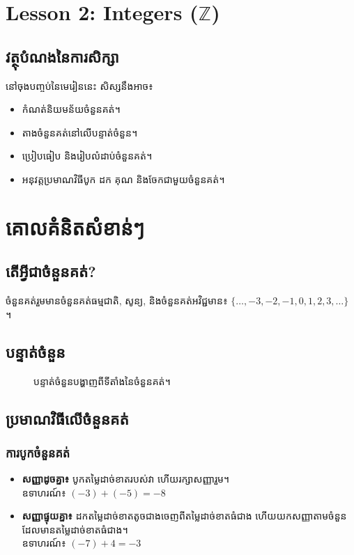 \clearpage
\setcounter{section}{0}

\section*{Lesson 2: Integers ($\mathbb{Z}$)}


\subsection*{វត្ថុបំណងនៃការសិក្សា}
នៅចុងបញ្ចប់នៃមេរៀននេះ សិស្សនឹងអាច៖
\begin{itemize}[label=---]
    \item កំណត់និយមន័យចំនួនគត់។
    \item តាងចំនួនគត់នៅលើបន្ទាត់ចំនួន។
    \item ប្រៀបធៀប និងរៀបលំដាប់ចំនួនគត់។
    \item អនុវត្តប្រមាណវិធីបូក ដក គុណ និងចែកជាមួយចំនួនគត់។
\end{itemize}

\section{គោលគំនិតសំខាន់ៗ}
\subsection{តើអ្វីជាចំនួនគត់?}
ចំនួនគត់រួមមានចំនួនគត់ធម្មជាតិ, សូន្យ, និងចំនួនគត់អវិជ្ជមាន៖ $\{\dots, -3, -2, -1, 0, 1, 2, 3, \dots\}$ ។

\subsection{បន្ទាត់ចំនួន}
\begin{figure}[h!]
    \centering
    \caption{បន្ទាត់ចំនួនបង្ហាញពីទីតាំងនៃចំនួនគត់។}
    \label{fig:integer-number-line}
\end{figure}

\subsection{ប្រមាណវិធីលើចំនួនគត់}
\subsubsection{ការបូកចំនួនគត់}
\begin{itemize}
    \item \textbf{សញ្ញាដូចគ្នា៖} បូកតម្លៃដាច់ខាតរបស់វា ហើយរក្សាសញ្ញារួម។\\
    ឧទាហរណ៍៖ $(-3) + (-5) = -8$
    \item \textbf{សញ្ញាផ្ទុយគ្នា៖} ដកតម្លៃដាច់ខាតតូចជាងចេញពីតម្លៃដាច់ខាតធំជាង ហើយយកសញ្ញាតាមចំនួនដែលមានតម្លៃដាច់ខាតធំជាង។\\
    ឧទាហរណ៍៖ $(-7) + 4 = -3$
\end{itemize}

